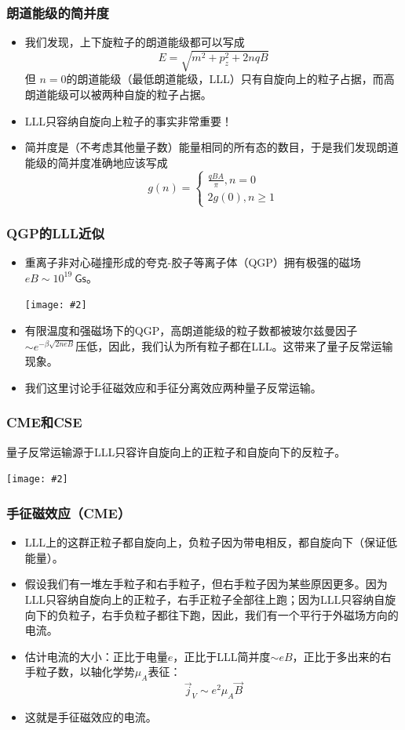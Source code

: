 \documentclass[aspectratio=1610,14pt,matheuler]{beamer}
\newcommand{\bch}{}
\newcommand{\ech}{}
\newcommand{\cpic}[2]{
\begin{center}
\texttt{[image: \#2]}
\end{center}
}
\begin{document}
\begin{frame}
\frametitle{\bch 朗道能级的简并度 \ech}
\bch
\begin{itemize}
\item
我们发现，上下旋粒子的朗道能级都可以写成
$$
E = \sqrt{m^2 +p_z^2 + 2nqB}
$$
但{\color{blue} $n=0$的朗道能级（最低朗道能级，LLL）只有自旋向上的粒子占据，而高朗道能级可以被两种自旋的粒子占据}。
\item
LLL只容纳自旋向上粒子的事实非常重要！
\item
简并度是（不考虑其他量子数）能量相同的所有态的数目，于是我们发现朗道能级的简并度准确地应该写成
$$
g(n) = 
\begin{cases}
\frac{qBA}{\pi}, n = 0 \\
2g(0), n \geq 1
\end{cases}
$$
\end{itemize}
\ech
\end{frame}


\begin{frame}
\frametitle{\bch QGP的LLL近似 \ech}
\bch
\begin{itemize}
\item 重离子非对心碰撞形成的夸克-胶子等离子体（QGP）拥有极强的磁场$eB \sim 10^{19} \mathsf{\ Gs}$。
\cpic{0.4}{mag_field}
\item 
有限温度和强磁场下的QGP，高朗道能级的粒子数都被玻尔兹曼因子$\sim e^{-\beta \sqrt{2neB}}$压低，因此，我们认为所有粒子都在LLL。这带来了{\color{blue}量子反常运输}现象。
\item 我们这里讨论{\color{blue}手征磁效应}和{\color{blue}手征分离效应}两种量子反常运输。

\end{itemize}
\ech
\end{frame}

\begin{frame}
\frametitle{\bch CME和CSE \ech}
\bch
{\small 量子反常运输源于LLL只容许自旋向上的正粒子和自旋向下的反粒子。}
\cpic{0.22}{anom_trans}
\ech
\end{frame} 
\begin{frame}

\frametitle{\bch 手征磁效应（CME） \ech}
\bch
\begin{itemize}
\item
LLL上的这群正粒子都自旋向上，负粒子因为带电相反，都自旋向下（保证低能量）。
\item
假设我们有一堆左手粒子和右手粒子，但右手粒子因为某些原因更多。因为LLL只容纳自旋向上的正粒子，右手正粒子全部往上跑；因为LLL只容纳自旋向下的负粒子，右手负粒子都往下跑，因此，我们有一个平行于外磁场方向的电流。
\item
估计电流的大小：正比于电量$e$，正比于LLL简并度$\sim eB$，正比于多出来的右手粒子数，以轴化学势$\mu_A$表征：{\color{blue}
$$
\vec j_V \sim e^2  \mu_A \vec B
$$
}
\item
这就是手征磁效应的电流。
\end{itemize}
\ech
\end{frame}
\end{document}
